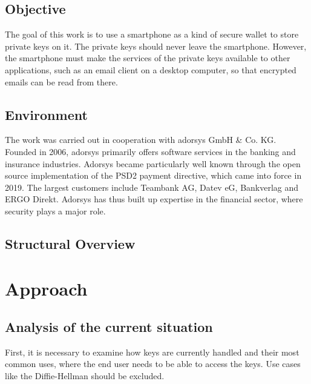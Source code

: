 \documentclass[12pt,oneside,a4paper,parskip]{scrbook}
\begin{document}

\section{Objective}

The goal of this work is to use a smartphone as a kind of secure wallet to store private keys on it. The private keys should never leave the smartphone. However, the smartphone must make the services of the private keys available to other applications, such as an email client on a desktop computer, so that encrypted emails can be read from there.

\section{Environment}

The work was carried out in cooperation with adorsys GmbH \& Co. KG. Founded in 2006, adorsys primarily offers software services in the banking and insurance industries. Adorsys became particularly well known through the open source implementation of the PSD2 payment directive, which came into force in 2019. The largest customers include Teambank AG, Datev eG, Bankverlag and ERGO Direkt. Adorsys has thus built up expertise in the financial sector, where security plays a major role. 

\section{Structural Overview}

\chapter{Approach}

\section{Analysis of the current situation}

First, it is necessary to examine how keys are currently handled and their most common uses, where the end user needs to be able to access the keys. Use cases like the Diffie-Hellman should be excluded. 
\end{document}
